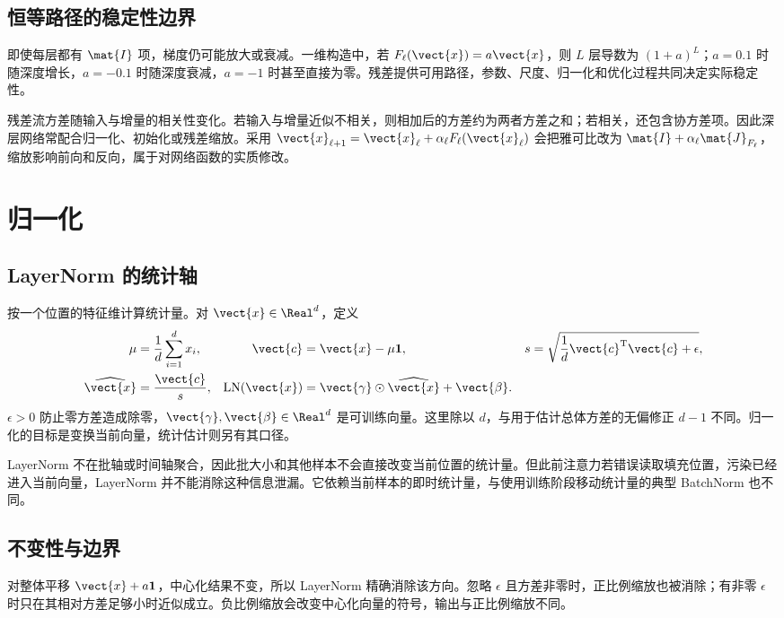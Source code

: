 \documentclass[../textbook.tex]{subfiles}
\begin{document}
\subsection{恒等路径的稳定性边界}
即使每层都有 $\mat{I}$ 项，梯度仍可能放大或衰减。一维构造中，若 $F_\ell(\vect{x})=a\vect{x}$，则 $L$ 层导数为 $(1+a)^L$；$a=0.1$ 时随深度增长，$a=-0.1$ 时随深度衰减，$a=-1$ 时甚至直接为零。残差提供可用路径，参数、尺度、归一化和优化过程共同决定实际稳定性。

残差流方差随输入与增量的相关性变化。若输入与增量近似不相关，则相加后的方差约为两者方差之和；若相关，还包含协方差项。因此深层网络常配合归一化、初始化或残差缩放。采用 $\vect{x}_{\ell+1}=\vect{x}_\ell+\alpha_\ell F_\ell(\vect{x}_\ell)$ 会把雅可比改为 $\mat{I}+\alpha_\ell \mat{J}_{F_\ell}$，缩放影响前向和反向，属于对网络函数的实质修改。

\section{归一化}

\subsection{LayerNorm 的统计轴}
按一个位置的特征维计算统计量\cite{ba2016layernorm}。对 $\vect{x}\in\Real^d$，定义
\begin{align}
 \mu&=\frac1d\sum_{i=1}^{d}x_i,&
 \vect{c}&=\vect{x}-\mu\mathbf1,&
 s&=\sqrt{\frac1d \vect{c}^{\mathrm{T}}\vect{c}+\epsilon},\\
 \widehat{\vect{x}}&=\frac{\vect{c}}s,&
 \operatorname{LN}(\vect{x})&=\vect{\gamma}\odot\widehat{\vect{x}}+\vect{\beta}.&&
\end{align}
$\epsilon>0$ 防止零方差造成除零，$\vect{\gamma},\vect{\beta}\in\Real^d$ 是可训练向量。这里除以 $d$，与用于估计总体方差的无偏修正 $d-1$ 不同。归一化的目标是变换当前向量，统计估计则另有其口径。

LayerNorm 不在批轴或时间轴聚合，因此批大小和其他样本不会直接改变当前位置的统计量。但此前注意力若错误读取填充位置，污染已经进入当前向量，LayerNorm 并不能消除这种信息泄漏。它依赖当前样本的即时统计量，与使用训练阶段移动统计量的典型 BatchNorm 也不同。

\subsection{不变性与边界}
对整体平移 $\vect{x}+a\mathbf1$，中心化结果不变，所以 LayerNorm 精确消除该方向。忽略 $\epsilon$ 且方差非零时，正比例缩放也被消除；有非零 $\epsilon$ 时只在其相对方差足够小时近似成立。负比例缩放会改变中心化向量的符号，输出与正比例缩放不同。
\end{document}
